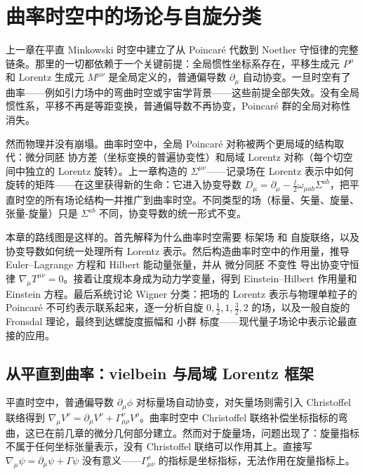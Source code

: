 \chapter{曲率时空中的场论与自旋分类}

上一章在平直 Minkowski 时空中建立了从 Poincaré 代数到 Noether 守恒律的完整链条。那里的一切都依赖于一个关键前提：全局惯性坐标系存在，平移生成元 $P^\mu$ 和 Lorentz 生成元 $M^{\mu\nu}$ 是全局定义的，普通偏导数 $\partial_\mu$ 自动协变。一旦时空有了曲率——例如引力场中的弯曲时空或宇宙学背景——这些前提全部失效。没有全局惯性系，平移不再是等距变换，普通偏导数不再协变，Poincaré 群的全局对称性消失。

然而物理并没有崩塌。曲率时空中，全局 Poincaré 对称被两个更局域的结构取代：微分同胚 协方差（坐标变换的普遍协变性）和局域 Lorentz 对称（每个切空间中独立的 Lorentz 旋转）。上一章构造的 $\Sigma^{\mu\nu}$——记录场在 Lorentz 表示中如何旋转的矩阵——在这里获得新的生命：它进入协变导数 $D_\mu=\partial_\mu-\frac{\ii}{2}\omega_{\mu ab}\Sigma^{ab}$，把平直时空的所有场论结构一并推广到曲率时空。不同类型的场（标量、矢量、旋量、张量-旋量）只是 $\Sigma^{ab}$ 不同，协变导数的统一形式不变。

本章的路线图是这样的。首先解释为什么曲率时空需要 标架场 和 自旋联络，以及协变导数如何统一处理所有 Lorentz 表示。然后构造曲率时空中的作用量，推导 Euler--Lagrange 方程和 Hilbert 能动量张量，并从 微分同胚 不变性 导出协变守恒律 $\nabla_\mu T^{\mu\nu}=0$。接着让度规本身成为动力学变量，得到 Einstein--Hilbert 作用量和 Einstein 方程。最后系统讨论 Wigner 分类：把场的 Lorentz 表示与物理单粒子的 Poincaré 不可约表示联系起来，逐一分析自旋 $0,\frac{1}{2},1,\frac{3}{2},2$ 的场，以及一般自旋的 Fronsdal 理论，最终到达螺旋度振幅和 小群 标度——现代量子场论中表示论最直接的应用。

\section{从平直到曲率：vielbein 与局域 Lorentz 框架}
平直时空中，普通偏导数 $\partial_\mu\phi$ 对标量场自动协变，对矢量场则需引入 Christoffel 联络得到 $\nabla_\mu V^\nu=\partial_\mu V^\nu+\Gamma^\nu_{\mu\rho}V^\rho$。曲率时空中 Christoffel 联络补偿坐标指标的弯曲，这已在前几章的微分几何部分建立。然而对于旋量场，问题出现了：旋量指标不属于任何坐标张量表示，没有 Christoffel 联络可以作用其上。直接写 $\nabla_\mu\psi=\partial_\mu\psi+\Gamma\psi$ 没有意义——$\Gamma^\rho_{\mu\nu}$ 的指标是坐标指标，无法作用在旋量指标上。

